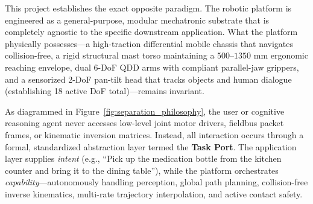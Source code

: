 This project establishes the exact opposite paradigm. The robotic platform is engineered as a general-purpose, modular mechatronic substrate that is completely agnostic to the specific downstream application. What the platform physically possesses---a high-traction differential mobile chassis that navigates collision-free, a rigid structural mast torso maintaining a $500\text{--}1350\text{ mm}$ ergonomic reaching envelope, dual 6-DoF QDD arms with compliant parallel-jaw grippers, and a sensorized 2-DoF pan-tilt head that tracks objects and human dialogue (establishing 18 active DoF total)---remains invariant.

As diagrammed in Figure~\ref{fig:separation_philosophy}, the user or cognitive reasoning agent never accesses low-level joint motor drivers, fieldbus packet frames, or kinematic inversion matrices. Instead, all interaction occurs through a formal, standardized abstraction layer termed the \textbf{Task Port}. The application layer supplies \emph{intent} (e.g., ``Pick up the medication bottle from the kitchen counter and bring it to the dining table''), while the platform orchestrates \emph{capability}---autonomously handling perception, global path planning, collision-free inverse kinematics, multi-rate trajectory interpolation, and active contact safety.


